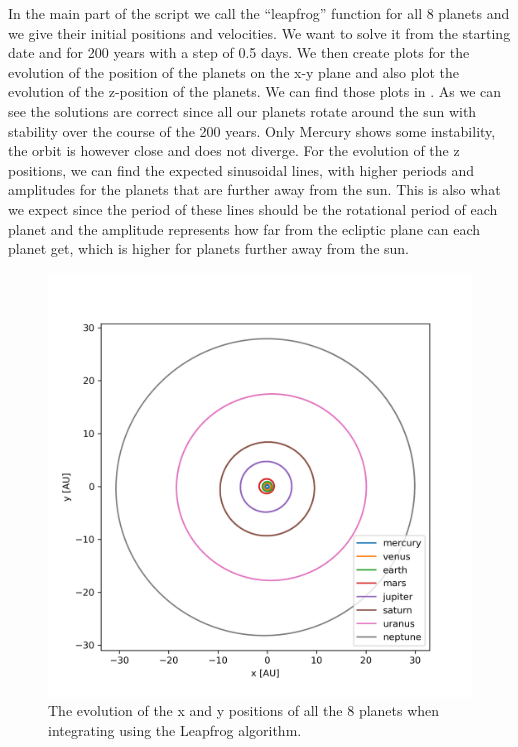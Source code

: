 \documentclass[a4paper,10pt]{article}
\begin{document}
In the main part of the script we call the ``leapfrog'' function for all 8 planets and we give their initial positions and velocities. We want to solve it from the starting date and for 200 years with a step of 0.5 days. We then create plots for the evolution of the position of the planets on the x-y plane and also plot the evolution of the z-position of the planets. We can find those plots in . As we can see the solutions are correct since all our planets rotate around the sun with stability over the course of the 200 years. Only Mercury shows some instability, the orbit is however close and does not diverge. For the evolution of the z positions, we can find the expected sinusoidal lines, with higher periods and amplitudes for the planets that are further away from the sun. This is also what we expect since the period of these lines should be the rotational period of each planet and the amplitude represents how far from the ecliptic plane can each planet get, which is higher for planets further away from the sun. 

\begin{figure}[H]
  \centering
  \includegraphics[width=.60\linewidth]{./plots/xy-leapfrog.png}
  \caption{The evolution of the x and y positions of all the 8 planets when integrating using the Leapfrog algorithm.}
  \label{fig:xy-leap}
\end{figure}
\end{document}
